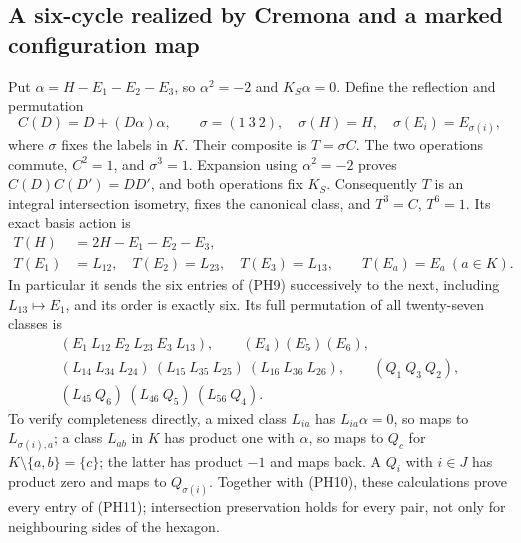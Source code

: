 \subsection{A six-cycle realized by Cremona and a marked configuration map}
Put $\alpha=H-E_1-E_2-E_3$, so $\alpha^2=-2$ and $K_S\alpha=0$.
Define the reflection and permutation
\[
 C(D)=D+(D\alpha)\alpha,
 \qquad \sigma=(1\ 3\ 2),\quad
 \sigma(H)=H,\quad\sigma(E_i)=E_{\sigma(i)},
\]
where $\sigma$ fixes the labels in $K$. Their composite is $T=\sigma C$.
The two operations commute, $C^2=1$, and $\sigma^3=1$. Expansion using
$\alpha^2=-2$ proves $C(D)C(D')=DD'$, and both operations fix $K_S$.
Consequently $T$ is an integral intersection isometry, fixes the canonical
class, and $T^3=C$, $T^6=1$. Its exact basis action is
\[
\begin{split}
T(H)&=2H-E_1-E_2-E_3,\\
T(E_1)&=L_{12},\quad T(E_2)=L_{23},\quad T(E_3)=L_{13},\qquad
T(E_a)=E_a\ (a\in K).
\end{split}                                                     \tag{PH10}
\]
In particular it sends the six entries of (PH9) successively to the next,
including $L_{13}\mapsto E_1$, and its order is exactly six.
Its full permutation of all twenty-seven classes is
\[
\begin{gathered}
(E_1\ L_{12}\ E_2\ L_{23}\ E_3\ L_{13}),\qquad
(E_4)(E_5)(E_6),\\
(L_{14}\ L_{34}\ L_{24})\ (L_{15}\ L_{35}\ L_{25})\
(L_{16}\ L_{36}\ L_{26}),\qquad (Q_1\ Q_3\ Q_2),\\
(L_{45}\ Q_6)\ (L_{46}\ Q_5)\ (L_{56}\ Q_4).
\end{gathered}                                                   \tag{PH11}
\]
To verify completeness directly, a mixed class $L_{ia}$ has $L_{ia}\alpha=0$,
so maps to $L_{\sigma(i),a}$; a class $L_{ab}$ in $K$ has product one with
$\alpha$, so maps to $Q_c$ for $K\setminus\{a,b\}=\{c\}$; the latter
has product $-1$ and maps back. A $Q_i$ with $i\in J$ has product zero
and maps to $Q_{\sigma(i)}$. Together with (PH10), these calculations prove
every entry of (PH11); intersection preservation holds for every pair,
not only for neighbouring sides of the hexagon.

